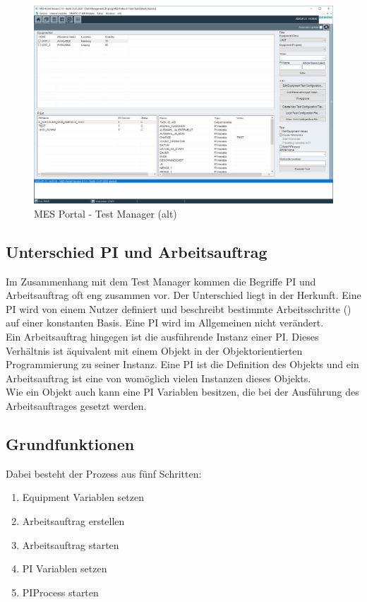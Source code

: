 \begin{figure}[htbp]
  \centering
  \includegraphics[width=\textwidth]{img/mes-portal_test-manage}
  \caption{\label{fig-mes_portal_test-manager}MES Portal - Test Manager (alt)}
\end{figure}

\newpage\subsection{Unterschied PI und Arbeitsauftrag}
Im Zusammenhang mit dem Test Manager kommen die Begriffe \gls{PI} und Arbeitsauftrag oft eng zusammen vor. Der Unterschied liegt in der Herkunft. Eine \gls{PI} wird von einem Nutzer definiert und beschreibt bestimmte Arbeitsschritte () auf einer konstanten Basis. Eine \gls{PI} wird im Allgemeinen nicht verändert.\\
Ein Arbeitsauftrag hingegen ist die ausführende Instanz einer \gls{PI}. Dieses Verhältnis ist äquivalent mit einem Objekt in der Objektorientierten Programmierung zu seiner Instanz. Eine \gls{PI} ist die Definition des Objekts und ein Arbeitsauftrag ist eine von womöglich vielen Instanzen dieses Objekts.\\
Wie ein Objekt auch kann eine \gls{PI} Variablen besitzen, die bei der Ausführung des Arbeitsauftrages gesetzt werden.

\subsection{Grundfunktionen}\label{sub_sec-test_manager-basics}
Dabei besteht der Prozess aus fünf Schritten:
\begin{enumerate}
\item Equipment Variablen setzen
\item Arbeitsauftrag erstellen
\item Arbeitsauftrag starten
\item \gls{PI} Variablen setzen
\item PIProcess starten
\end{enumerate}

